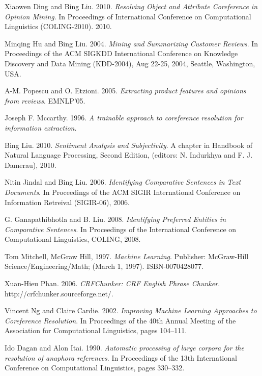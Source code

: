 \documentclass[12pt]{report}
\begin{document}
\newpage
{}
\begin{thebibliography}{30}

	Xiaowen Ding and Bing Liu. 2010.
	\textit{Resolving Object and Attribute Coreference in Opinion Mining}. 
	In Proceedings of International Conference on Computational Linguistics (COLING-2010). 2010.
	 
	Minqing Hu and Bing Liu. 2004.
	\textit{Mining and Summarizing Customer Reviews}.
	In Proceedings of the ACM SIGKDD International Conference on Knowledge Discovery and Data Mining (KDD-2004), Aug 22-25, 2004, Seattle, Washington, USA.

	A-M. Popescu and O. Etzioni. 2005. 
	\textit{Extracting product features and opinions from reviews}.
	EMNLP’05.

	Joseph F. Mccarthy. 1996.
 	\textit{A trainable approach to coreference resolution for information extraction}.

 	Bing Liu. 2010.
 	\textit{Sentiment Analysis and Subjectivity}. A chapter in 
  	Handbook of Natural Language Processing, Second Edition, 
  	(editors: N. Indurkhya and F. J. Damerau), 2010.

  	Nitin Jindal and Bing Liu. 2006.  
  	\textit{Identifying Comparative Sentences in Text Documents}. 
   	In Proceedings of the ACM SIGIR International Conference on 
   	Information Retreival (SIGIR-06), 2006.

	G. Ganapathibhotla and B. Liu. 2008.
	\textit{Identifying Preferred Entities in Comparative Sentences}.
	In Proceedings of the International Conference on Computational Linguistics, COLING, 2008.

	Tom Mitchell, McGraw Hill, 1997.
	\textit{Machine Learning}.
	Publisher: McGraw-Hill Science/Engineering/Math; (March 1, 1997). ISBN-0070428077.	

	Xuan-Hieu Phan. 2006.
	\textit{CRFChunker: CRF English Phrase Chunker}. 
	http://crfchunker.sourceforge.net/.

	Vincent Ng and Claire Cardie. 2002.
	\textit{Improving Machine Learning Approaches to Coreference Resolution}.
	In Proceedings of the 40th Annual Meeting of the Association for Computational Linguistics, pages 104–111.

	Ido Dagan and Alon Itai. 1990.
	\textit{Automatic processing of large corpora for the resolution of anaphora references}.
	In Proceedings of the 13th International Conference on Computational Linguistics, pages 330–332.


\end{thebibliography}
\end{document}
